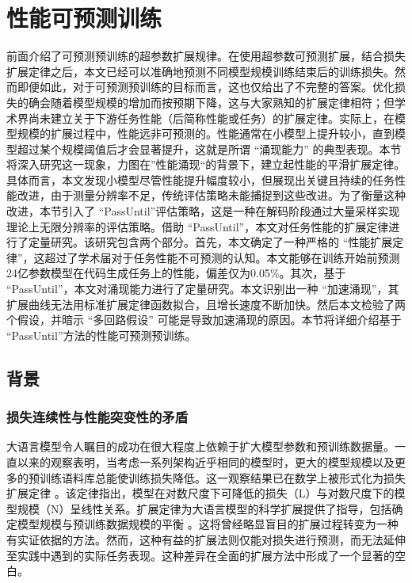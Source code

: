 


\section{性能可预测训练}

前面介绍了可预测预训练的超参数扩展规律。在使用超参数可预测扩展，结合损失扩展定律之后，本文已经可以准确地预测不同模型规模训练结束后的训练损失。然而即便如此，对于可预测预训练的目标而言，这也仅给出了不完整的答案。优化损失的确会随着模型规模的增加而按预期下降，这与大家熟知的扩展定律相符；但学术界尚未建立关于下游任务性能（后简称性能或任务）的扩展定律。实际上，在模型规模的扩展过程中，性能远非可预测的。性能通常在小模型上提升较小，直到模型超过某个规模阈值后才会显著提升，这就是所谓 “涌现能力” 的典型表现。本节将深入研究这一现象，力图在”性能涌现“的背景下，建立起性能的平滑扩展定律。具体而言，本文发现小模型尽管性能提升幅度较小，但展现出关键且持续的任务性能改进，由于测量分辨率不足，传统评估策略未能捕捉到这些改进。为了衡量这种改进，本节引入了 “PassUntil”评估策略，这是一种在解码阶段通过大量采样实现理论上无限分辨率的评估策略。借助 “PassUntil”，本文对任务性能的扩展定律进行了定量研究。该研究包含两个部分。首先，本文确定了一种严格的 “性能扩展定律”，这超过了学术届对于任务性能不可预测的认知。本文能够在训练开始前预测24亿参数模型在代码生成任务上的性能，偏差仅为0.05\%。其次，基于 “PassUntil”，本文对涌现能力进行了定量研究。本文识别出一种 “加速涌现”，其扩展曲线无法用标准扩展定律函数拟合，且增长速度不断加快。然后本文检验了两个假设，并暗示 “多回路假设” 可能是导致加速涌现的原因。本节将详细介绍基于 “PassUntil”方法的性能可预测预训练。

\subsection{背景}
\subsubsection{损失连续性与性能突变性的矛盾}

大语言模型令人瞩目的成功在很大程度上依赖于扩大模型参数和预训练数据量。一直以来的观察表明，当考虑一系列架构近乎相同的模型时，更大的模型规模以及更多的预训练语料库总能使训练损失降低。这一观察结果已在数学上被形式化为损失扩展定律 \citep{kaplan2020scaling, henighan2020scaling}。该定律指出，模型在对数尺度下可降低的损失（L）与对数尺度下的模型规模（N）呈线性关系。扩展定律为大语言模型的科学扩展提供了指导，包括确定模型规模与预训练数据规模的平衡 \citep{hoffmann2022training, muennighoff2023scaling}。这将曾经略显盲目的扩展过程转变为一种有实证依据的方法。然而，这种有益的扩展法则仅能对损失进行预测，而无法延伸至实践中遇到的实际任务表现\cite{ganguli2022predictability}。这种差异在全面的扩展方法中形成了一个显著的空白。


